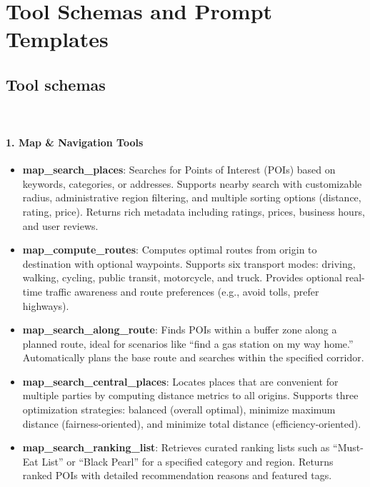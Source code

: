 \documentclass{article} %
\begin{document}



\appendix
\section{Tool Schemas and Prompt Templates} \label{app:prompt}
\subsection{Tool schemas}~\label{app:tools}


\paragraph{1. Map \& Navigation Tools}
\begin{itemize}
    \item \textbf{map\_search\_places}: Searches for Points of Interest (POIs) based on keywords, categories, or addresses. Supports nearby search with customizable radius, administrative region filtering, and multiple sorting options (distance, rating, price). Returns rich metadata including ratings, prices, business hours, and user reviews.
    \item \textbf{map\_compute\_routes}: Computes optimal routes from origin to destination with optional waypoints. Supports six transport modes: driving, walking, cycling, public transit, motorcycle, and truck. Provides optional real-time traffic awareness and route preferences (e.g., avoid tolls, prefer highways).
    \item \textbf{map\_search\_along\_route}: Finds POIs within a buffer zone along a planned route, ideal for scenarios like ``find a gas station on my way home.'' Automatically plans the base route and searches within the specified corridor.
    \item \textbf{map\_search\_central\_places}: Locates places that are convenient for multiple parties by computing distance metrics to all origins. Supports three optimization strategies: balanced (overall optimal), minimize maximum distance (fairness-oriented), and minimize total distance (efficiency-oriented).
    \item \textbf{map\_search\_ranking\_list}: Retrieves curated ranking lists such as ``Must-Eat List'' or ``Black Pearl'' for a specified category and region. Returns ranked POIs with detailed recommendation reasons and featured tags.
\end{itemize}
\end{document}
